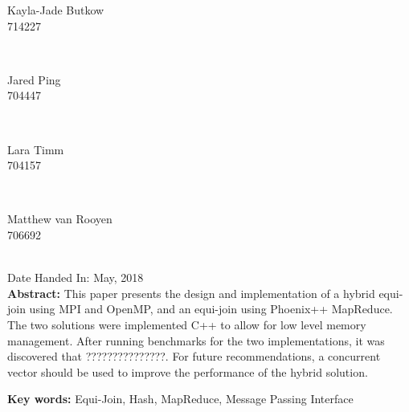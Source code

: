 \documentclass[10pt,twocolumn]{witseiepaper}
\begin{document}
\begin{titlepage}
		
		\begin{minipage}{0.4\textwidth}
			\begin{flushleft} \large
				Kayla-Jade Butkow \\ 714227 %
			\end{flushleft}
		\end{minipage}
		~
		\begin{minipage}{0.4\textwidth}
			\begin{flushright} \large
				Jared Ping \\ 704447
			\end{flushright}
		\end{minipage}\\[1cm]
		
		\begin{minipage}{0.4\textwidth}
			\begin{flushleft} \large
				Lara Timm \\ 704157
			\end{flushleft}
		\end{minipage}
		~
		\begin{minipage}{0.4\textwidth}
			\begin{flushright} \large
				Matthew van Rooyen \\ 706692
			\end{flushright}
		\end{minipage}\\[1cm]
		{\large Date Handed In:  May, 2018}\\[1cm] 
\vfill	
\justify
\textbf{Abstract:} This paper presents the design and implementation of a hybrid equi-join using MPI and OpenMP, and an equi-join using Phoenix++ MapReduce. The two solutions were implemented C++ to allow for low level memory management. After running benchmarks for the two implementations, it was discovered that ???????????????. For future recommendations, a concurrent vector should be used to improve the performance of the hybrid solution.

\textbf{Key words:} Equi-Join, Hash, MapReduce, Message Passing Interface 
		
	\end{titlepage}

\pagestyle{plain}
\setcounter{page}{1}
\twocolumn
\end{document}
